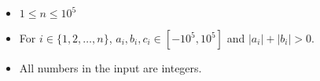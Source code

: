 \begin{itemize}
	\tightlist
	\item $1 \le n \le 10^5$
	\item For $i\in \{1,2,\dots,n\}$, $a_i,b_i,c_i\in [-10^5,10^5]$ and $|a_i|+|b_i|>0$.
    \item All numbers in the input are integers.
\end{itemize}

